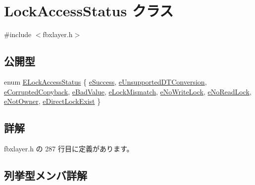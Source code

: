 \hypertarget{class_lock_access_status}{}\section{Lock\+Access\+Status クラス}
\label{class_lock_access_status}


{\ttfamily \#include $<$fbxlayer.\+h$>$}

\subsection*{公開型}
\begin{DoxyCompactItemize}
\item 
enum \hyperlink{class_lock_access_status_a3314dad01b38dd90f5393e108a07b3c1}{E\+Lock\+Access\+Status} \{ \newline
\hyperlink{class_lock_access_status_a3314dad01b38dd90f5393e108a07b3c1a4752cb677cd6e0773a183026891015d2}{e\+Success}, 
\hyperlink{class_lock_access_status_a3314dad01b38dd90f5393e108a07b3c1aff6857643db00dac38b2a47ec38349cd}{e\+Unsupported\+D\+T\+Conversion}, 
\hyperlink{class_lock_access_status_a3314dad01b38dd90f5393e108a07b3c1a843d354729b050835958be016bfbc25e}{e\+Corrupted\+Copyback}, 
\hyperlink{class_lock_access_status_a3314dad01b38dd90f5393e108a07b3c1a121af28b9da26b3788e913667f5204b3}{e\+Bad\+Value}, 
\newline
\hyperlink{class_lock_access_status_a3314dad01b38dd90f5393e108a07b3c1a75ff4df964ba8cf5caf0e9e97f4dd2b1}{e\+Lock\+Mismatch}, 
\hyperlink{class_lock_access_status_a3314dad01b38dd90f5393e108a07b3c1ab996ac48091e53ae688b050d659cb914}{e\+No\+Write\+Lock}, 
\hyperlink{class_lock_access_status_a3314dad01b38dd90f5393e108a07b3c1aaebdb6e01670d0283da340a09f5cd3e7}{e\+No\+Read\+Lock}, 
\hyperlink{class_lock_access_status_a3314dad01b38dd90f5393e108a07b3c1a9e208d564a70b003d7dfd591d0319cd4}{e\+Not\+Owner}, 
\newline
\hyperlink{class_lock_access_status_a3314dad01b38dd90f5393e108a07b3c1a8f66f2ab4d7d4ee48ba0ce835ad2047f}{e\+Direct\+Lock\+Exist}
 \}
\end{DoxyCompactItemize}


\subsection{詳解}


 fbxlayer.\+h の 287 行目に定義があります。



\subsection{列挙型メンバ詳解}
\mbox{\label{class_lock_access_status_a3314dad01b38dd90f5393e108a07b3c1}} 
